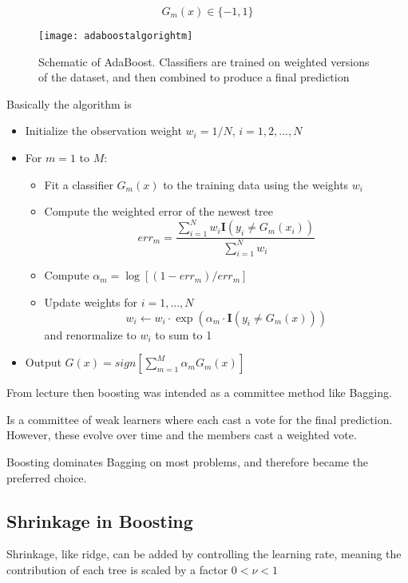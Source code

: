 \[
    G_m(x) \in \{-1, 1\}
\]

\begin{figure}[H]
  \centering
  \texttt{[image: adaboostalgorightm]}
  \caption{Schematic of AdaBoost. Classifiers are trained on weighted versions of the dataset, and then combined to produce a final prediction}\label{fig:adaboostalgorightm}
\end{figure}

Basically the algorithm is

\begin{itemize}
  \item Initialize the observation weight $w_i = 1/N$, $i = 1, 2, ... , N$
  \item For $m=1$ to $M$:
  \begin{itemize}
    \item Fit a classifier $G_m(x)$ to the training data using the weights $w_i$
    \item Compute the weighted error of the newest tree
    \[
        err_m = \frac{\sum_{i=1}^{N} w_i \bm{I} (y_i \neq G_m(x_i))}{\sum_{i=1}^{N} w_i}
    \]
    \item Compute $\alpha_m = \log [(1 - err_m) / err_m ]$
    \item Update weights for $i = 1,...,N$
    \[
        w_i \leftarrow w_i \cdot \exp( \alpha_m \cdot \bm{I}(y_i \neq G_m(x)) )
    \]
    and renormalize to $w_i$ to sum to 1
  \end{itemize}
  \item Output $G(x) = sign \left[ \sum_{m=1}^{M} \alpha_m G_m(x) \right]$
\end{itemize}

From lecture \cite[p.~27]{lecture9} then boosting was intended as a committee method like Bagging.

Is a committee of weak learners where each cast a vote for the
final prediction. However, these evolve over time and the
members cast a weighted vote. 

Boosting dominates Bagging on most problems, and therefore
became the preferred choice.

\subsection{Shrinkage in Boosting}

Shrinkage, like ridge, can be added by controlling the learning rate, meaning the contribution of each tree is scaled by a factor $0 < \nu < 1$ 


